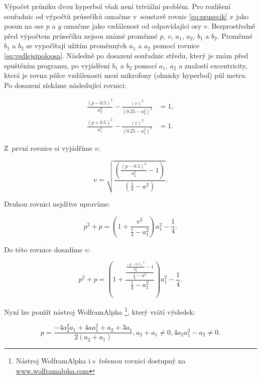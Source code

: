 Výpočet průniku dvou hyperbol však není triviální problém. Pro rozlišení souřadnic od výpočtů průsečíků označme v~soustavě rovnic \ref{eq:prusecik} $x$ jako posun na ose $p$ a $y$ označme jako vzdálenost od odpovídající osy $v$. Bezprostředně před výpočtem průsečíku nejsou známé proměnné $p$, $v$, $a_1$, $a_2$, $b_1$ a $b_2$. Proměnné $b_1$ a $b_2$ se vypočítají užitím proměnných $a_1$ a $a_2$ pomocí rovnice \ref{eq:vedlejsipoloosa}. Následně po dosazení souřadnic středu, který je znám před spuštěním programu, po vyjádření $b_1$ a $b_2$ pomocí $a_1$, $a_2$ a znalostí excentricity, která je rovna půlce vzdálenosti mezi mikrofony (ohnisky hyperbol) půl metru. Po dosazení získáme následující rovnici:

\begin{align}
    \label{eq:rovnice_prusecik}
    \frac{(p-0.5)^2}{a_{2}^2}-\frac{(v)^2}{(0.25-a_{2}^2)^2}&=1, \\
    \frac{(p+0.5)^2}{a_{1}^2}-\frac{(v)^2}{(0.25-a_{1}^2)^2}&=1.
\end{align}

Z~první rovnice si vyjádříme $v$:

\begin{equation}
    \label{eq:y}
    v = \sqrt{\frac{(\frac{(p-0.5)^2}{a_{2}^2}-1)}{(\frac{1}{4}-a^2)}  }.
\end{equation}

Druhou rovnici nejdříve upravíme:

\begin{equation}
    p^2 + p = (1+\frac{v^2}{\frac{1}{4}-a_{1}^2})a_{1}^2-\frac{1}{4}.
\end{equation}

Do této rovnice dosadíme $v$:

\begin{equation}
    p^2 + p = (1+\frac{\frac{\frac{(p-0.5)^2}{a_{2}^2}-1}{\frac{1}{4}-a^2}}{\frac{1}{4}-a_{1}^2})a_{1}^2-\frac{1}{4}.
\end{equation}

Nyní lze použít nástroj WolframAlpha \footnote{Nástroj WolframAlpha i s~řešenou rovnicí dostupný na \href{https://www.wolframalpha.com/input/?i=\%28\%28\%281\%2B\%28+\%28\%28\%28\%28\%28y-0.5\%29\%5E2\%29\%2F+++++b\%5E2++++\%29-1\%29+++++*\%280.25-++++b\%5E2++++\%29+\%29\%2F\%280.25-++++a\%5E2+++\%29\%29\%29*+++a\%5E2++++\%29-0.25\%29\%3D\%28y\%5E2\%29\%2By}{www.wolframalpha.com} }, který vrátí výsledek:

\begin{equation}
    p = \frac{-4 a_{2}^2 a_{1} + 4 a a_{1}^2 + a_{2} + 3 a_{1}}{2 (a_{2} + a_{1})} ,a_{2} + a_{1} \neq 0, 4 a_{2} a_{1}^2 - a_{2} \neq 0.
    \label{x}
\end{equation}

